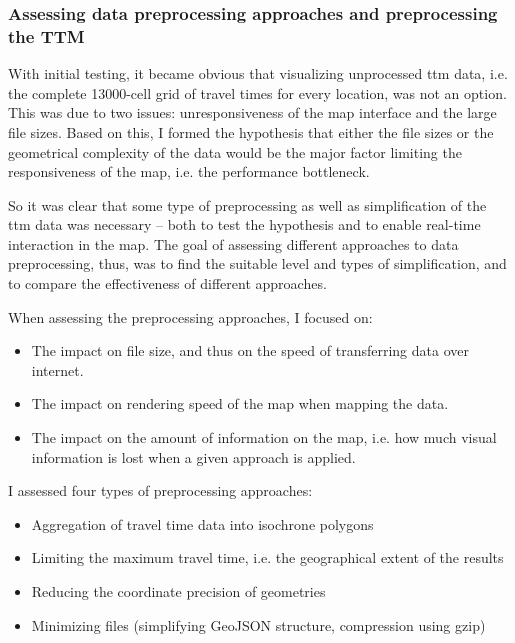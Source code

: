 



\subsubsection{Assessing data preprocessing approaches and preprocessing the TTM}

\label{sec:preprocessing}
With initial testing,
it became obvious that
visualizing unprocessed \acrshort{ttm} data,
i.e. the complete 13000-cell grid of travel times for every location,
was not an option. This was due to two issues:
unresponsiveness of the map interface and the large file sizes.
Based on this,
I formed the hypothesis that either the file sizes
or the geometrical complexity of the data would be
the major factor limiting the responsiveness of the map,
i.e. the performance bottleneck.

So it was clear that
some type of preprocessing as well as simplification of the 
\acrshort{ttm} data was necessary --
both to test the hypothesis and to enable real-time interaction in the map.
The goal of assessing different approaches to data preprocessing, thus,
was to find the suitable level and types of simplification,
and to compare the effectiveness of different approaches.

When assessing the preprocessing approaches, I focused on:
\begin{itemize}
	\item The impact on file size, and thus on the speed of transferring data over internet.
	\item The impact on rendering speed of the map when mapping the data.
	\item The impact on the amount of information on the map,
	i.e. how much visual information is lost when a given approach is applied.
\end{itemize}

I assessed four types of preprocessing approaches:
\begin{itemize}
	\item Aggregation of travel time data into isochrone polygons 
	\item Limiting the maximum travel time, i.e. the geographical extent of the results 
	\item Reducing the coordinate precision of geometries
	\item Minimizing files (simplifying GeoJSON structure, compression using gzip)
\end{itemize}

